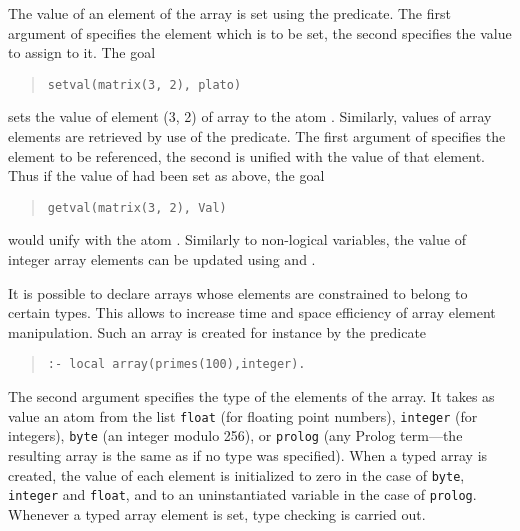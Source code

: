 The value of an element of the array is set using the
predicate. The first argument of
 specifies the element
which is
to be set, the second specifies the value to assign to it.
The goal
\begin{quote}
\begin{verbatim}
setval(matrix(3, 2), plato)
\end{verbatim}
\end{quote}
sets the value
of element (3, 2) of array  to the atom .
Similarly, values of array elements are retrieved by use of the
predicate. The first argument of
 specifies the element to
be
referenced, the second is unified with the value of that element.
Thus if the value of  had been set as above, the goal
\begin{quote}
\begin{verbatim}
getval(matrix(3, 2), Val)
\end{verbatim}
\end{quote}
would unify  with the atom .
Similarly to non-logical variables, the value of integer array elements
can be updated using  and
.

It is possible to declare arrays whose elements are
constrained to belong to certain types. This allows {\eclipse} to increase
time and space efficiency of array element manipulation.
Such an array is created for instance by the predicate
\begin{quote}
\begin{verbatim}
:- local array(primes(100),integer).
\end{verbatim}
\end{quote}
The second argument specifies the type of the elements of the array.
It takes as value an atom from the
list {\tt float} (for floating point numbers),
{\tt integer} (for integers), {\tt byte} (an integer modulo 256),
or {\tt prolog} (any Prolog term---the resulting array is the
same as if no type was specified).
When a typed array is created, the value of each element is initialized to zero
in the case of {\tt byte}, {\tt integer} and {\tt float}, and to
an uninstantiated variable in the case of {\tt prolog}.
Whenever a typed array element is set, type checking is carried out.

